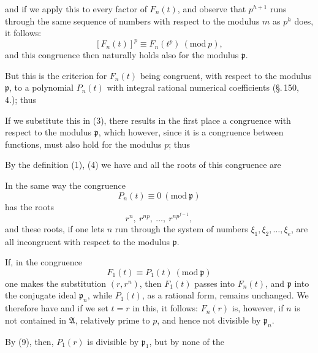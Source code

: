 and if we apply this to every factor of $F_n(t)$, and observe
that $p^{h+1}$ runs through the same sequence of numbers with
respect to the modulus $m$ as $p^h$ does, it follows:
\[
[F_n(t)]^p \equiv F_n(t^p) \ (\mathrm{mod}\ p),
\]
and this congruence then naturally holds also for the modulus $\mathfrak p$.

But this is the criterion for $F_n(t)$ being congruent, with
respect to the modulus $\mathfrak p$, to a polynomial $P_n(t)$ with integral
rational numerical coefficients (\S.\,150, 4.); thus

If we substitute this in (3), there results in the first place
a congruence with respect to the modulus $\mathfrak p$, which however,
since it is a congruence between  functions, must also
hold for the modulus $p$; thus

By the definition (1), (4) we have
and all the roots of this congruence are

In the same way the congruence
\[
P_n(t) \equiv 0 \ (\mathrm{mod}\ \mathfrak p)
\]
has the roots
\[
r^n,\ r^{np},\ \ldots,\ r^{np^{f-1}},
\]
and these roots, if one lets $n$ run through the system of numbers
$\xi_1, \xi_2, \ldots, \xi_e$, are all incongruent with respect to the
modulus $\mathfrak p$.

If, in the congruence
\[
F_1(t) \equiv P_1(t) \ (\mathrm{mod}\ \mathfrak p)
\]
one makes the substitution $(r, r^n)$, then $F_1(t)$ passes into $F_n(t)$,
and $\mathfrak p$ into the conjugate ideal $\mathfrak p_n$, while $P_1(t)$, as a rational
form, remains unchanged. We therefore have
and if we set $t=r$ in this, it follows:
$F_n(r)$ is, however, if $n$ is not contained in $\mathfrak A$, relatively
prime to $p$, and hence not divisible by $\mathfrak p_n$.

By (9), then, $P_1(r)$ is divisible by $\mathfrak p_1$, but by none of the
